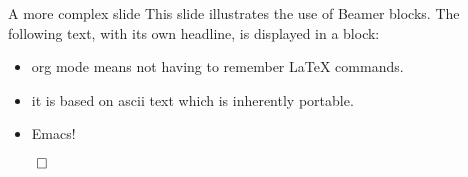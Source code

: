 \documentclass[presentation]{beamer}
\begin{document}
\begin{frame}[label={sec:orgb73677f}]{A more complex slide}
This slide illustrates the use of Beamer blocks.  The following text,
with its own headline, is displayed in a block:
\begin{theorem}
\begin{itemize}
\item org mode means not having to remember \LaTeX{} commands.
\item it is based on ascii text which is inherently portable.
\item Emacs!
\end{itemize}

\hfill \(\qed\)
\end{theorem}
\end{frame}
\end{document}
